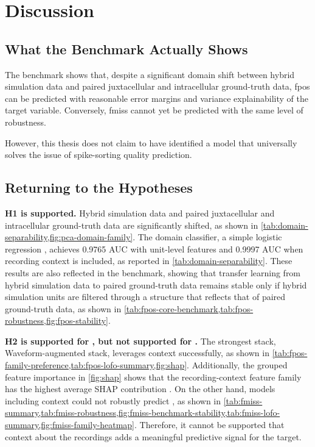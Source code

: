 \chapter{Discussion}
\label{chap:discussion}

\section{What the Benchmark Actually Shows}

The benchmark shows that, despite a significant domain shift between hybrid simulation data and paired juxtacellular and intracellular ground-truth data, fpos can be predicted with reasonable error margins and variance explainability of the target variable. Conversely, fmiss cannot yet be predicted with the same level of robustness. 

However, this thesis does not claim to have identified a model that universally solves the issue of spike-sorting quality prediction. 

\section{Returning to the Hypotheses}

\textbf{H1 is supported.} Hybrid simulation data and paired juxtacellular and intracellular ground-truth data are significantly shifted, as shown in \cref{tab:domain-separability,fig:pca-domain-family}. The domain classifier, a simple logistic regression \parencite{10.1111/j.2517-6161.1958.tb00292.x}, achieves 0.9765 AUC with unit-level features and 0.9997 AUC when recording context is included, as reported in \cref{tab:domain-separability}. These results are also reflected in the benchmark, showing that transfer learning from hybrid simulation data to paired ground-truth data remains stable only if hybrid simulation units are filtered through a structure that reflects that of paired ground-truth data, as shown in \cref{tab:fpos-core-benchmark,tab:fpos-robustness,fig:fpos-stability}.

\textbf{H2 is supported for \fpos{}, but not supported for \fmiss{}.} The strongest \fpos{} stack, Waveform-augmented stack, leverages context successfully, as shown in \cref{tab:fpos-family-preference,tab:fpos-lofo-summary,fig:shap}. Additionally, the grouped feature importance in \cref{fig:shap} shows that the recording-context feature family has the highest average SHAP contribution \parencite{lundberg2017unifiedapproachinterpretingmodel}. On the other hand, models including context could not robustly predict \fmiss{}, as shown in \cref{tab:fmiss-summary,tab:fmiss-robustness,fig:fmiss-benchmark-stability,tab:fmiss-lofo-summary,fig:fmiss-family-heatmap}. Therefore, it cannot be supported that context about the recordings adds a meaningful predictive signal for the \fmiss{} target.

